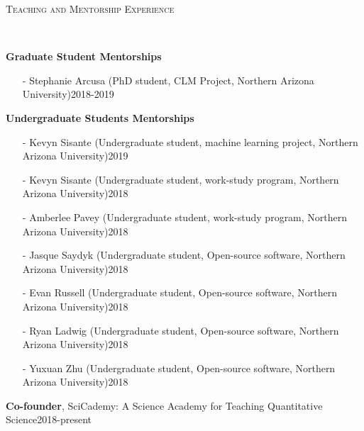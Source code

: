 \documentclass[10pt]{article}
\newenvironment{changemargin}[2]{%
  \begin{list}{}{%
    \setlength{\topsep}{0pt}%
    \setlength{\leftmargin}{#1}%
    \setlength{\rightmargin}{#2}%
    \setlength{\listparindent}{\parindent}%
    \setlength{\itemindent}{\parindent}%
    \setlength{\parsep}{\parskip}%
  }%
  \item[]}{\end{list}
}
\newcommand{\lineover}{
	\begin{changemargin}{-0.05in}{-0.05in}
		\vspace*{-8pt}
		\hrulefill \\
		\vspace*{-2pt}
	\end{changemargin}
}
\newcommand{\header}[1]{
	\begin{changemargin}{-0.5in}{-0.5in}
		\scshape{#1}\\
  	\lineover
	\end{changemargin}
}
\newenvironment{body} {
	\vspace*{-2pt}
	\begin{changemargin}{-0.5in}{-0.5in}
  }
	{\end{changemargin}
}
\begin{document}
\header{Teaching and Mentorship Experience}

\begin{body}



	\textbf{Graduate Student Mentorships}\\
		\vspace*{-4pt}
		\begin{itemize} \itemsep -0pt
  		\item[-]	Stephanie Arcusa (PhD student, CLM Project, Northern Arizona University)\hfill {2018-2019}\\
  	\end{itemize}

	\medskip
	\textbf{Undergraduate Students Mentorships}\\
		\vspace*{-4pt}
		\begin{itemize} \itemsep -0pt
  		\item[-]	Kevyn Sisante (Undergraduate student, machine learning project, Northern Arizona University)\hfill {2019}\\
  		\item[-]	Kevyn Sisante (Undergraduate student, work-study program, Northern Arizona University)\hfill {2018}\\
  		\item[-]	Amberlee Pavey (Undergraduate student, work-study program, Northern Arizona University)\hfill {2018}\\
  		\item[-]	Jasque Saydyk (Undergraduate student, Open-source software, Northern Arizona University)\hfill {2018}\\
  		\item[-]	Evan Russell (Undergraduate student, Open-source software, Northern Arizona University)\hfill {2018}\\
  		\item[-]	Ryan Ladwig (Undergraduate student, Open-source software, Northern Arizona University)\hfill {2018}\\
  		\item[-]	Yuxuan Zhu (Undergraduate student, Open-source software, Northern Arizona University)\hfill {2018}\\
  	\end{itemize}

	\medskip

  	\textbf{Co-founder}, SciCademy: A Science Academy for Teaching Quantitative Science\hfill {2018-present}\\
	\medskip


\end{body}
\end{document}
